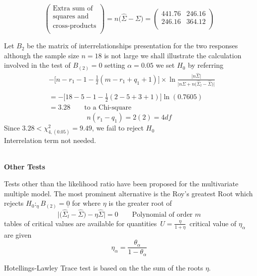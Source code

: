 \documentclass[11pt,a4paper]{article}
\theoremstyle{definition}
\begin{document}
$$\begin{pmatrix}
\text{Extra sum of }\\
\text{squares and }\\
\text{cross-products}\\
\end{pmatrix}=n\big(\widehat{\Sigma}-\Sigma\big)=
\begin{pmatrix}
441.76 & 246.16\\
246.16 & 364.12\\
\end{pmatrix}$$



Let $B_2$ be the matrix of interrelationships presentation for the two responses although the sample size $n=18$ is not large we shall illustrate the calculation involved in the test of $B_{(2)} = 0 $ setting $\alpha = 0.05$ we set $H_0$ by referring
\begin{align*}
&-\big[n-r_1-1-\frac{1}{2}(m-r_1+q_1+1)\big]\times \ln \frac{\big|n\widehat{\Sigma}\big|}{\Big|n\widehat{\Sigma}+n\big(\widehat{\Sigma}_l-\widehat{\Sigma}\big)\Big|}\\\\
& = -\big[18 - 5 -1 -\frac{1}{2}(2-5+3+1)\big]\ln (0.7605)\\
& = 3.28\qquad \text{to a Chi-square}
\end{align*}
$$n(r_1-q_1)=2(2) = 4 df$$
Since $3.28 < \chi^2_{4,(0.05)}= 9.49$, we fail to reject $H_0$\\
Interrelation term not needed.\\\\





\begin{center}
\textbf{Other Tests}
\end{center}
Tests other than the likelihood ratio have been proposed for the multivariate multiple model. The most prominent alternative is the Roy's greatest Root which rejects $H_0:_{\eta}B_{(2)}=\underline{0}$ for where $\eta$ is the greater root of $$\Bigg|\Big(\widehat{\Sigma}_l-\widehat{\Sigma}\Big)-\eta \widehat{\Sigma}\Bigg| = 0\qquad\text{Polynomial of order }m$$
 tables of critical values are available for quantities \,$\displaystyle{U=\frac{\eta}{1 + \eta}}\,$ critical value of $\eta_{\alpha}$ are given $$\eta_{\alpha} = \frac{\theta_{\alpha}}{1- \theta_{\alpha}}$$
 
 
Hotellings-Lawley Trace test is based on the the sum of the roots $\eta$.\\
\end{document}
